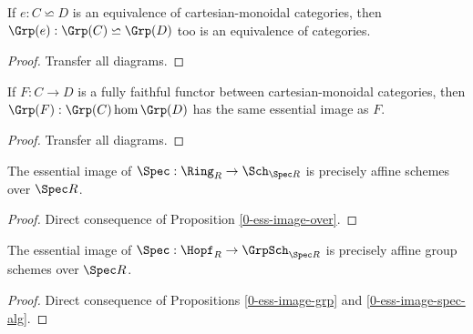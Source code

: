 \begin{proposition}
  \label{0-grp-equiv}
  \uses{}
  \leanok

  If $e : C \backsimeq D$ is an equivalence of cartesian-monoidal categories, then $\Grp(e) : \Grp(C) \backsimeq \Grp(D)$ too is an equivalence of categories.
\end{proposition}
\begin{proof}
  \uses{}
  \leanok

  Transfer all diagrams.
\end{proof}


\begin{proposition}
  \label{0-ess-image-grp}
  \uses{}
  \leanok

  If $F : C \to D$ is a fully faithful functor between cartesian-monoidal categories, then $\Grp(F) : \Grp(C) \hom \Grp(D)$ has the same essential image as $F$.
\end{proposition}
\begin{proof}

  Transfer all diagrams.
\end{proof}


\begin{proposition}
  \label{0-ess-image-spec-alg}
  \leanok

  The essential image of $\Spec : \Ring_R \to \Sch_{\Spec R}$ is precisely affine schemes over $\Spec R$.
\end{proposition}
\begin{proof}

  Direct consequence of Proposition \ref{0-ess-image-over}.
\end{proof}


\begin{proposition}
  \label{0-ess-image-spec-hopf}
  \leanok

  The essential image of $\Spec : \Hopf_R \to \GrpSch_{\Spec R}$ is precisely affine group schemes over $\Spec R$.
\end{proposition}
\begin{proof}
  \leanok

  Direct consequence of Propositions \ref{0-ess-image-grp} and \ref{0-ess-image-spec-alg}.
\end{proof}


